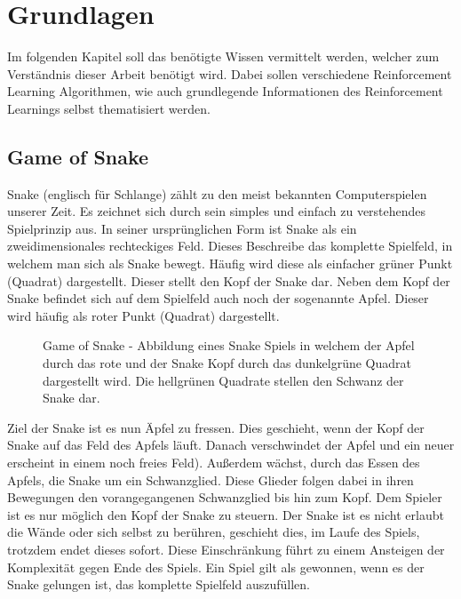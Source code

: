 
\chapter{Grundlagen}\label{sec:Grundlagen}
Im folgenden Kapitel soll das benötigte Wissen vermittelt werden, welcher zum Verständnis dieser Arbeit benötigt wird. Dabei sollen verschiedene Reinforcement Learning Algorithmen, wie auch grundlegende Informationen des Reinforcement Learnings selbst thematisiert werden. 
\section{Game of Snake}
Snake (englisch für Schlange) zählt zu den meist bekannten Computerspielen unserer Zeit. Es zeichnet sich durch sein simples und einfach zu verstehendes Spielprinzip aus.
In seiner ursprünglichen Form ist Snake als ein zweidimensionales rechteckiges Feld. Dieses Beschreibe das komplette Spielfeld, in welchem man sich als Snake bewegt. Häufig wird diese als einfacher grüner Punkt (Quadrat) dargestellt. Dieser stellt den Kopf der Snake dar. Neben dem Kopf der Snake befindet sich auf dem Spielfeld auch noch der sogenannte Apfel. Dieser wird häufig als roter Punkt (Quadrat) dargestellt.
\begin{figure}[H]
	\centering
	\def\svgscale{0.80}
	
	\caption[Game of Snake]{Game of Snake - Abbildung eines Snake Spiels in welchem der Apfel durch das rote und der Snake Kopf durch das dunkelgrüne Quadrat dargestellt wird. Die hellgrünen Quadrate stellen den Schwanz der Snake dar.}
	\label{fig:Game_of_Snake}
\end{figure}
Ziel der Snake ist es nun Äpfel zu fressen. Dies geschieht, wenn der Kopf der Snake auf das Feld des Apfels läuft. Danach verschwindet der Apfel und ein neuer erscheint in einem noch freies Feld). Außerdem wächst, durch das Essen des Apfels, die Snake um ein Schwanzglied. Diese Glieder folgen dabei in ihren Bewegungen den vorangegangenen Schwanzglied bis hin zum Kopf. Dem Spieler ist es nur möglich den Kopf der Snake zu steuern.
Der Snake ist es nicht erlaubt die Wände oder sich selbst zu berühren, geschieht dies, im Laufe des Spiels, trotzdem endet dieses sofort. Diese Einschränkung führt zu einem Ansteigen der Komplexität gegen Ende des Spiels. Ein Spiel gilt als gewonnen, wenn es der Snake gelungen ist, das komplette Spielfeld auszufüllen.


